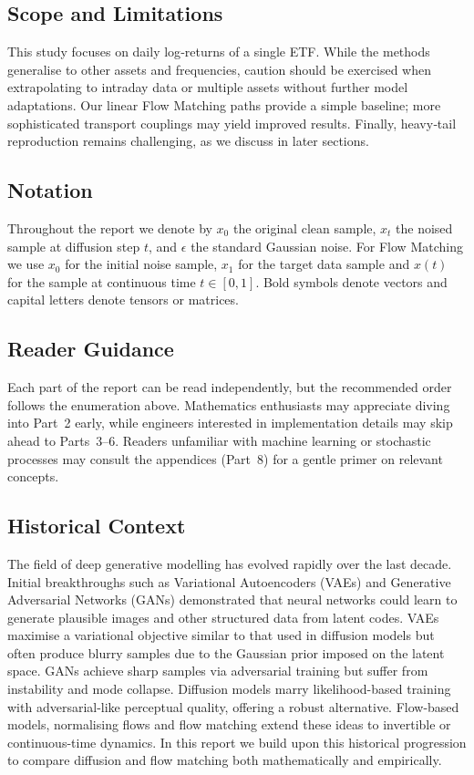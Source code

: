 \subsection{Scope and Limitations}

This study focuses on daily log‑returns of a single ETF.  While the
methods generalise to other assets and frequencies, caution should be
exercised when extrapolating to intraday data or multiple assets
without further model adaptations.  Our linear Flow Matching paths
provide a simple baseline; more sophisticated transport couplings may
yield improved results.  Finally, heavy‑tail reproduction remains
challenging, as we discuss in later sections.

\subsection{Notation}

Throughout the report we denote by $x_0$ the original clean sample,
$x_t$ the noised sample at diffusion step $t$, and $\epsilon$ the
standard Gaussian noise.  For Flow Matching we use $x_0$ for the
initial noise sample, $x_1$ for the target data sample and $x(t)$ for
the sample at continuous time $t \in [0,1]$.  Bold symbols denote
vectors and capital letters denote tensors or matrices.

\subsection{Reader Guidance}

Each part of the report can be read independently, but the
recommended order follows the enumeration above.  Mathematics
enthusiasts may appreciate diving into Part~2 early, while engineers
interested in implementation details may skip ahead to Parts~3–6.
Readers unfamiliar with machine learning or stochastic processes may
consult the appendices (Part~8) for a gentle primer on relevant
concepts.

\subsection{Historical Context}

The field of deep generative modelling has evolved rapidly over the
last decade.  Initial breakthroughs such as Variational Autoencoders
(VAEs) and Generative Adversarial Networks (GANs) demonstrated that
neural networks could learn to generate plausible images and other
structured data from latent codes.  VAEs maximise a variational
objective similar to that used in diffusion models but often produce
blurry samples due to the Gaussian prior imposed on the latent
space.  GANs achieve sharp samples via adversarial training but
suffer from instability and mode collapse.  Diffusion models marry
likelihood-based training with adversarial-like perceptual quality,
offering a robust alternative.  Flow-based models, normalising
flows and flow matching extend these ideas to invertible or
continuous-time dynamics.  In this report we build upon this
historical progression to compare diffusion and flow matching both
mathematically and empirically.

